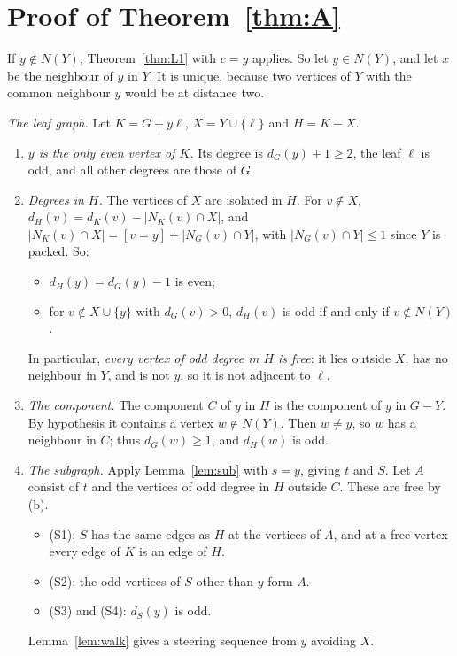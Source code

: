 \documentclass[11pt]{amsart}
\theoremstyle{definition}
\begin{document}
\section{Proof of Theorem~\ref{thm:A}}\label{sec:proof}

If $y\notin N(Y)$, Theorem~\ref{thm:L1} with $c=y$ applies. So let $y\in N(Y)$, and let $x$ be the
neighbour of $y$ in $Y$. It is unique, because two vertices of $Y$ with the common neighbour $y$ would be
at distance two.

\emph{The leaf graph.} Let $K=G+y\ell$, $X=Y\cup\{\ell\}$ and $H=K-X$.
\begin{enumerate}[label=(\alph*)]
\item \emph{$y$ is the only even vertex of $K$.} Its degree is $d_G(y)+1\ge2$, the leaf $\ell$ is
odd, and all other degrees are those of $G$.
\item \emph{Degrees in $H$.} The vertices of $X$ are isolated in $H$. For $v\notin X$,
$d_H(v)=d_K(v)-|N_K(v)\cap X|$, and $|N_K(v)\cap X|=[v=y]+|N_G(v)\cap Y|$, with $|N_G(v)\cap Y|\le1$
since $Y$ is packed. So:
  \begin{itemize}
  \item $d_H(y)=d_G(y)-1$ is even;
  \item for $v\notin X\cup\{y\}$ with $d_G(v)>0$, $d_H(v)$ is odd if and only if $v\notin N(Y)$.
  \end{itemize}
  In particular, \emph{every vertex of odd degree in $H$ is free}: it lies outside $X$, has no neighbour
  in $Y$, and is not $y$, so it is not adjacent to $\ell$.
\item \emph{The component.} The component $C$ of $y$ in $H$ is the component of $y$ in $G-Y$. By
hypothesis it contains a vertex $w\notin N(Y)$. Then $w\ne y$, so $w$ has a neighbour in $C$; thus
$d_G(w)\ge1$, and $d_H(w)$ is odd.
\item \emph{The subgraph.} Apply Lemma~\ref{lem:sub} with $s=y$, giving $t$ and $S$. Let $A$ consist of
$t$ and the vertices of odd degree in $H$ outside $C$. These are free by (b).
  \begin{itemize}
  \item (S1): $S$ has the same edges as $H$ at the vertices of $A$, and at a free vertex every edge of
  $K$ is an edge of $H$.
  \item (S2): the odd vertices of $S$ other than $y$ form $A$.
  \item (S3) and (S4): $d_S(y)$ is odd.
  \end{itemize}
  Lemma~\ref{lem:walk} gives a steering sequence from $y$ avoiding $X$.

\end{enumerate}
\end{document}
